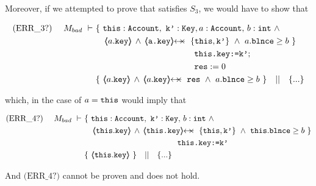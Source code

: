 Moreover, if we attempted to prove that  satisfies $S_3$, we would have to show that

\small{
\begin{align*}
\text{(ERR\_3?)}  \ \ \ \ M_{bad}\ \vdash \ 
		&	\{  \ \prg{this}:\prg{Account},\ \prg{k'}:\prg{Key}, a:\prg{Account},\, b:\prg{int}\ \wedge \\
  	 &	  \ \ \     \inside{a.\prg{key}}  \, \wedge \,    \protectedFrom {\prg{a.key}} { \{\prg{this},\prg{k'} \} }   
 	  \ \wedge\ a.\prg{\balance}\geq b \ \}  \\
 					& \SPT \SPT   \SPT\SPT  \prg{this.key:=k'}; \\ 
 			& \SPT \SPT   \SPT\SPT \prg{res}:=0 \\  
 	       	& \{ \  \inside{a.\prg{key}}  \, \wedge \, \protectedFrom {a.\prg{key}} {\prg{res}} \ \wedge\  a.\prg{\balance}\geq b \ \}  \ \ \  || \ \ \ 
		   \{ ... \}
\end{align*}
}

which, in the case of $a=\mbox{\normalfont{\texttt{this}}}$ would imply that

\small{
\begin{align*}
\text{(ERR\_4?)}  \ \ \ \ M_{bad}\ \vdash \ 
		&	\{  \ \prg{this}:\prg{Account},\ \prg{k'}:\prg{Key}, \, b:\prg{int}\ \wedge \\
  	 &	  \ \ \     \inside{\prg{this}.\prg{key}}  \, \wedge \,    \protectedFrom {\prg{\prg{this}.key}} { \{\prg{this},\prg{k'} \} }   
 	  \ \wedge\ \prg{this}.\prg{\balance}\geq b \ \}  \\
 					& \SPT \SPT   \SPT\SPT  \prg{this.key:=k'} \\
 	& \{ \  \inside{\prg{this}.\prg{key}}     \ \}  \ \ \  || \ \ \ 
		   \{ ... \}
\end{align*}
}

And  $\text{(ERR\_4?)}$ cannot be proven and does not hold.


